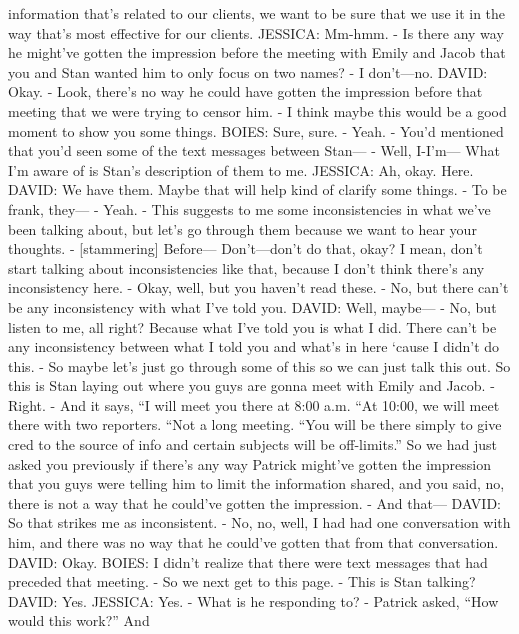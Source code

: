 \begin{itemize}
\begin{itemize}
    information that's related to our clients, we want to be sure that
    we use it in the way that's most effective for our clients. JESSICA:
    Mm-hmm. - Is there any way he might've gotten the impression before
    the meeting with Emily and Jacob that you and Stan wanted him to
    only focus on two names? - I don't---no. DAVID: Okay. - Look,
    there's no way he could have gotten the impression before that
    meeting that we were trying to censor him. - I think maybe this
    would be a good moment to show you some things. BOIES: Sure, sure. -
    Yeah. - You'd mentioned that you'd seen some of the text messages
    between Stan--- - Well, I-I'm--- What I'm aware of is Stan's
    description of them to me. JESSICA: Ah, okay. Here. DAVID: We have
    them. Maybe that will help kind of clarify some things. - To be
    frank, they--- - Yeah. - This suggests to me some inconsistencies in
    what we've been talking about, but let's go through them because we
    want to hear your thoughts. - {[}stammering{]} Before---
    Don't---don't do that, okay? I mean, don't start talking about
    inconsistencies like that, because I don't think there's any
    inconsistency here. - Okay, well, but you haven't read these. - No,
    but there can't be any inconsistency with what I've told you. DAVID:
    Well, maybe--- - No, but listen to me, all right? Because what I've
    told you is what I did. There can't be any inconsistency between
    what I told you and what's in here `cause I didn't do this. - So
    maybe let's just go through some of this so we can just talk this
    out. So this is Stan laying out where you guys are gonna meet with
    Emily and Jacob. - Right. - And it says, ``I will meet you there at
    8:00 a.m. ``At 10:00, we will meet there with two reporters. ``Not a
    long meeting. ``You will be there simply to give cred to the source
    of info and certain subjects will be off-limits.'' So we had just
    asked you previously if there's any way Patrick might've gotten the
    impression that you guys were telling him to limit the information
    shared, and you said, no, there is not a way that he could've gotten
    the impression. - And that--- DAVID: So that strikes me as
    inconsistent. - No, no, well, I had had one conversation with him,
    and there was no way that he could've gotten that from that
    conversation. DAVID: Okay. BOIES: I didn't realize that there were
    text messages that had preceded that meeting. - So we next get to
    this page. - This is Stan talking? DAVID: Yes. JESSICA: Yes. - What
    is he responding to? - Patrick asked, ``How would this work?'' And

\end{itemize}
\end{itemize}
